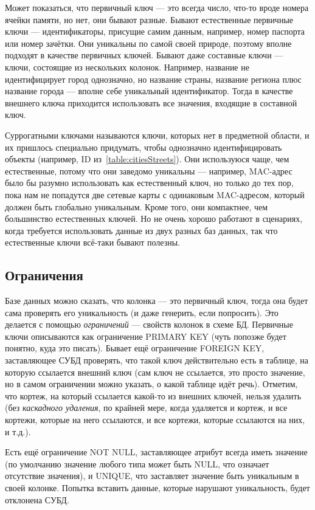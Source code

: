 \documentclass{../../text-style}
\begin{document}
Может показаться, что первичный ключ --- это всегда число, что-то вроде номера ячейки памяти, но нет, они бывают разные. Бывают естественные первичные ключи --- идентификаторы, присущие самим данным, например, номер паспорта или номер зачётки. Они уникальны по самой своей природе, поэтому вполне подходят в качестве первичных ключей. Бывают даже составные ключи --- ключи, состоящие из нескольких колонок. Например, название не идентифицирует город однозначно, но название страны, название региона плюс название города --- вполне себе уникальный идентификатор. Тогда в качестве внешнего ключа приходится использовать все значения, входящие в составной ключ.

Суррогатными ключами называются ключи, которых нет в предметной области, и их пришлось специально придумать, чтобы однозначно идентифицировать объекты (например, ID из~\ref{table:citiesStreets}). Они используюся чаще, чем естественные, потому что они заведомо уникальны --- например, MAC-адрес было бы разумно использовать как естественный ключ, но только до тех пор, пока нам не попадутся две сетевые карты с одинаковым MAC-адресом, который должен быть глобально уникальным. Кроме того, они компактнее, чем большинство естественных ключей. Но не очень хорошо работают в сценариях, когда требуется использовать данные из двух разных баз данных, так что естественные ключи всё-таки бывают полезны.

\subsection{Ограничения}

Базе данных можно сказать, что колонка --- это первичный ключ, тогда она будет сама проверять его уникальность (и даже генерить, если попросить). Это делается с помощью \textit{ограничений} --- свойств колонок в схеме БД. Первичные ключи описываются как ограничение PRIMARY KEY (чуть попозже будет понятно, куда это писать). Бывает ещё ограничение FOREIGN KEY, заставляющее СУБД проверять, что такой ключ действительно есть в таблице, на которую ссылается внешний ключ (сам ключ не ссылается, это просто значение, но в самом ограничении можно указать, о какой таблице идёт речь). Отметим, что кортеж, на который ссылается какой-то из внешних ключей, нельзя удалить (без \textit{каскадного удаления}, по крайней мере, когда удаляется и кортеж, и все кортежи, которые на него ссылаются, и все кортежи, которые ссылаются на них, и т.д.).

Есть ещё ограничение NOT NULL, заставляющее атрибут всегда иметь значение (по умолчанию значение любого типа может быть NULL, что означает отсутствие значения), и UNIQUE, что заставляет значение быть уникальным в своей колонке. Попытка вставить данные, которые нарушают уникальность, будет отклонена СУБД.
\end{document}
